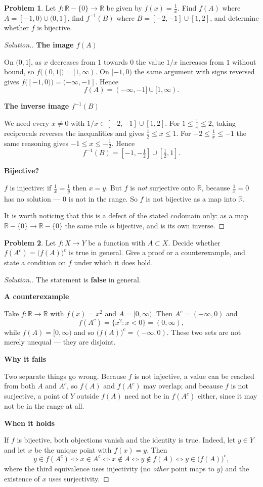\documentclass[11pt,a4paper]{article}
\theoremstyle{definition}
\newtheorem{problemx}{Problem}[section]
\newenvironment{problem}{\begin{problemx}}{\end{problemx}}
\newenvironment{solution}
  {\renewcommand{\qedsymbol}{}\begin{proof}[\textit{Solution}.]}
  {\end{proof}}
\newcommand{\subhead}[1]{%
  \par\medskip\noindent\textbf{#1}\par\nobreak\smallskip}
\begin{document}
\begin{problem}
Let $f:\mathbb{R}-\{0\}\rightarrow \mathbb{R}$ be given by $f(x)=\frac{1}{x}$.
Find $f(A)$ where $A=[-1,0)\cup (0,1]$, find $f^{-1}(B)$ where
$B=[-2,-1]\cup [1,2]$, and determine whether $f$ is bijective.
\end{problem}
\begin{solution}
\subhead{The image $f(A)$}
On $(0,1]$, as $x$ decreases from $1$ towards $0$ the value $1/x$ increases
from $1$ without bound, so $f\big((0,1]\big)=[1,\infty)$. On $[-1,0)$ the same
argument with signs reversed gives $f\big([-1,0)\big)=(-\infty,-1]$. Hence
$$f(A)=(-\infty,-1]\cup[1,\infty).$$

\subhead{The inverse image $f^{-1}(B)$}
We need every $x\neq 0$ with $1/x\in[-2,-1]\cup[1,2]$. For $1\leq \frac1x\leq
2$, taking reciprocals reverses the inequalities and gives
$\frac12\leq x\leq 1$. For $-2\leq\frac1x\leq -1$ the same reasoning gives
$-1\leq x\leq -\frac12$. Hence
$$f^{-1}(B)=\left[-1,-\tfrac{1}{2}\right]\cup\left[\tfrac{1}{2},1\right].$$

\subhead{Bijective?}
$f$ is injective: if $\frac1x=\frac1y$ then $x=y$. But $f$ is \emph{not}
surjective onto $\mathbb{R}$, because $\frac1x=0$ has no solution --- $0$ is
not in the range. So $f$ is not bijective as a map into $\mathbb{R}$.

It is worth noticing that this is a defect of the stated codomain only: as a
map $\mathbb{R}-\{0\}\rightarrow\mathbb{R}-\{0\}$ the same rule \emph{is}
bijective, and is its own inverse.
\end{solution}

\begin{problem}
Let $f:X\rightarrow Y$ be a function with $A\subset X$. Decide whether
$f(A^c)=\big(f(A)\big)^c$ is true in general. Give a proof or a counterexample,
and state a condition on $f$ under which it does hold.
\end{problem}
\begin{solution}
The statement is \textbf{false} in general.

\subhead{A counterexample}
Take $f:\mathbb{R}\rightarrow\mathbb{R}$ with $f(x)=x^2$ and $A=[0,\infty)$.
Then $A^c=(-\infty,0)$ and
$$f(A^c)=\{x^2:x<0\}=(0,\infty),$$
while $f(A)=[0,\infty)$ and so $\big(f(A)\big)^c=(-\infty,0)$. These two sets
are not merely unequal --- they are disjoint.

\subhead{Why it fails}
Two separate things go wrong. Because $f$ is not injective, a value can be
reached from both $A$ and $A^c$, so $f(A)$ and $f(A^c)$ may overlap; and
because $f$ is not surjective, a point of $Y$ outside $f(A)$ need not be in
$f(A^c)$ either, since it may not be in the range at all.

\subhead{When it holds}
If $f$ is bijective, both objections vanish and the identity is true. Indeed,
let $y\in Y$ and let $x$ be the unique point with $f(x)=y$. Then
$$y\in f(A^c)\iff x\in A^c \iff x\notin A \iff y\notin f(A)\iff
y\in\big(f(A)\big)^c,$$
where the third equivalence uses injectivity (no \emph{other} point maps to
$y$) and the existence of $x$ uses surjectivity.
\end{solution}
\end{document}
